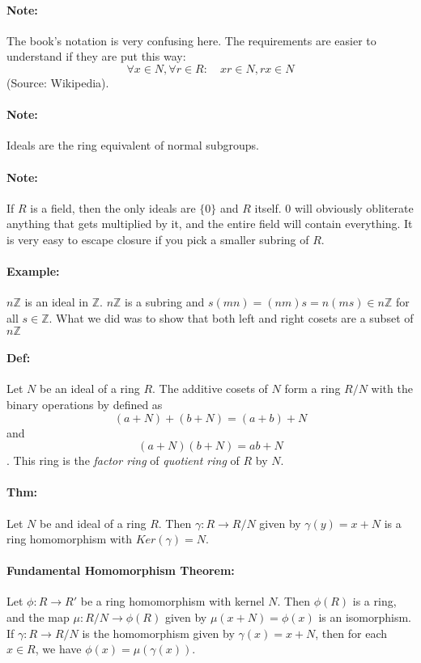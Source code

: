 \documentclass[10pt,a4paper]{article}
\begin{document}
\paragraph{Note:} The book's notation is very confusing here. The requirements are easier to understand if they are put this way: $$\forall x \in N, \forall r \in R: \quad xr \in N, rx \in N$$(Source: Wikipedia).

\paragraph{Note:} Ideals are the ring equivalent of normal subgroups.

\paragraph{Note:} If $R$ is a field, then the only ideals are $\{0\}$ and $R$ itself. 0 will obviously obliterate anything that gets multiplied by it, and the entire field will contain everything. It is very easy to escape closure if you pick a smaller subring of $R$.

\paragraph{Example:} $n\mathbb{Z}$ is an ideal in $\mathbb{Z}$. $n\mathbb{Z}$ is a subring and $s(mn) = (nm)s = n(ms) \in n\mathbb{Z}$ for all $s \in \mathbb{Z}$. What we did was to show that both left and right cosets are a subset of $n\mathbb{Z}$

\paragraph{Def:} Let $N$ be an ideal of a ring $R$. The additive cosets of $N$ form a ring $R/N$ with the binary operations by defined as $$ (a+N)+(b+N) = (a+b)+N$$ and $$(a+N)(b+N) = ab+N$$. This ring is the \textit{factor ring} of \textit{quotient ring} of $R$ by $N$.

\paragraph{Thm:} Let $N$ be and ideal of a ring $R$. Then $\gamma : R \to R/N$ given by $\gamma (y) = x+N$ is a ring homomorphism with $Ker(\gamma) = N$.

\paragraph{Fundamental Homomorphism Theorem:} Let $\phi:R \to R'$ be a ring homomorphism with kernel $N$. Then $\phi(R)$ is a ring, and the map $\mu: R/N \to \phi(R)$ given by $\mu(x+N)=\phi(x)$ is an isomorphism. If $\gamma:R \to R/N$ is the homomorphism given by $\gamma(x) = x+N$, then for each $x \in R$, we have $\phi(x) = \mu(\gamma(x))$.
\end{document}
